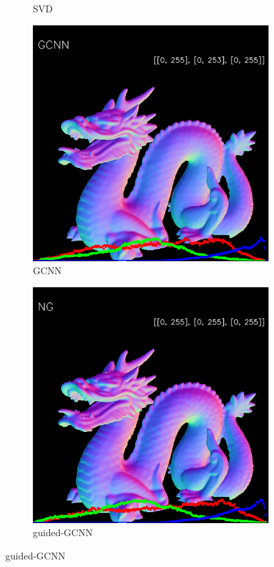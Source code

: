 \begin{figure}[h!]
\begin{subfigure}[b]{0.24\linewidth}
		\caption{SVD}
	\end{subfigure}
	\begin{subfigure}[b]{0.24\linewidth}
		\includegraphics[width=\linewidth]{./Figures/comparison/fancy_eval_3_normal_GCNN.png}
		\caption{GCNN}
	\end{subfigure}
	\begin{subfigure}[b]{0.24\linewidth}
		\includegraphics[width=\linewidth]{./Figures/comparison/fancy_eval_3_normal_NG.png}
		\caption{guided-GCNN}
	\end{subfigure}
	

\end{figure}
